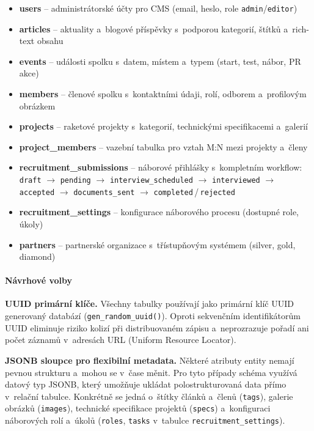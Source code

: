 \begin{itemize}
    \item \textbf{users} -- administrátorské účty pro CMS (email, heslo, role \texttt{admin}/\texttt{editor})
    \item \textbf{articles} -- aktuality a~blogové příspěvky s~podporou kategorií, štítků a~rich-text obsahu
    \item \textbf{events} -- události spolku s~datem, místem a~typem (start, test, nábor, PR akce)
    \item \textbf{members} -- členové spolku s~kontaktními údaji, rolí, odborem a~profilovým obrázkem
    \item \textbf{projects} -- raketové projekty s~kategorií, technickými specifikacemi a~galerií
    \item \textbf{project\_members} -- vazební tabulka pro vztah M:N mezi projekty a~členy
    \item \textbf{recruitment\_submissions} -- náborové přihlášky s~kompletním workflow:\newline
    \texttt{draft} $\rightarrow$ \texttt{pending} $\rightarrow$ \texttt{interview\_scheduled} $\rightarrow$ \texttt{interviewed} $\rightarrow$ \texttt{accepted} $\rightarrow$ \texttt{documents\_sent} $\rightarrow$ \texttt{completed}\,/\,\texttt{rejected}
    \item \textbf{recruitment\_settings} -- konfigurace náborového procesu (dostupné role, úkoly)
    \item \textbf{partners} -- partnerské organizace s~třístupňovým systémem (silver, gold, diamond)
\end{itemize}

\paragraph{Návrhové volby}

\textbf{UUID primární klíče.} Všechny tabulky používají jako primární klíč UUID generovaný databází (\texttt{gen\_random\_uuid()}). Oproti sekvenčním identifikátorům UUID eliminuje riziko kolizí při distribuovaném zápisu a~neprozrazuje pořadí ani počet záznamů v~adresách URL (Uniform Resource Locator).

\textbf{JSONB sloupce pro flexibilní metadata.} Některé atributy entity nemají pevnou strukturu a~mohou se v~čase měnit. Pro tyto případy schéma využívá datový typ JSONB, který umožňuje ukládat polostrukturovaná data přímo v~relační tabulce. Konkrétně se jedná o~štítky článků a~členů (\texttt{tags}), galerie obrázků (\texttt{images}), technické specifikace projektů (\texttt{specs}) a~konfiguraci náborových rolí a~úkolů (\texttt{roles}, \texttt{tasks} v~tabulce \texttt{recruitment\_settings}).

